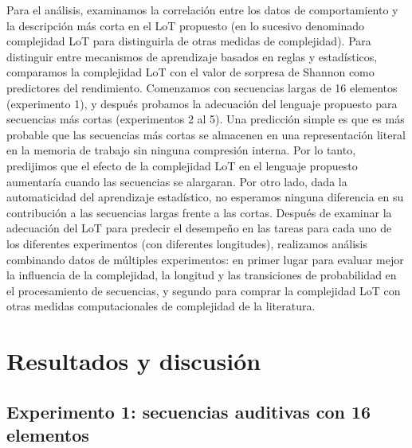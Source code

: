 Para el análisis, examinamos la correlación entre los datos de comportamiento y la descripción más corta en el LoT propuesto (en lo sucesivo denominado complejidad LoT para distinguirla de otras medidas de complejidad). Para distinguir entre mecanismos de aprendizaje basados en reglas y estadísticos, comparamos la complejidad LoT con el valor de sorpresa de Shannon como predictores del rendimiento. Comenzamos con secuencias largas de 16 elementos (experimento 1), y después probamos la adecuación del lenguaje propuesto para secuencias más cortas (experimentos 2 al 5). Una predicción simple es que es más probable que las secuencias más cortas se almacenen en una representación literal en la memoria de trabajo sin ninguna compresión interna. Por lo tanto, predijimos que el efecto de la complejidad LoT en el lenguaje propuesto aumentaría cuando las secuencias se alargaran. Por otro lado, dada la automaticidad del aprendizaje estadístico, no esperamos ninguna diferencia en su contribución a las secuencias largas frente a las cortas. Después de examinar la adecuación del LoT para predecir el desempeño en las tareas para cada uno de los diferentes experimentos (con diferentes longitudes), realizamos análisis combinando datos de múltiples experimentos: en primer lugar para evaluar mejor la influencia de la complejidad, la longitud y las transiciones de probabilidad en el procesamiento de secuencias, y segundo para comprar la complejidad LoT con otras medidas computacionales de complejidad de la literatura. 

\section{Resultados y discusión}

\subsection{Experimento 1: secuencias auditivas con 16 elementos}

